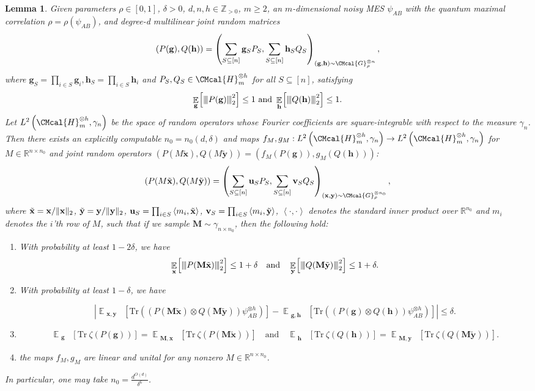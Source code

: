 \documentclass[11pt]{article}
\def\G{\CMcal{G}}
\def\H{\CMcal{H}}
\theoremstyle{plain}
\newtheorem{lemma}[theorem]{Lemma}
\theoremstyle{definition}
\newcommand {\minusspace} {\: \! \!}
\newcommand {\Fn} [2] {\ensuremath{ #1 \minusspace \Br{ #2 } }}
\newcommand{\reals}{{\mathbb R}}
\newcommand {\innerproduct} [2] {\ensuremath{\left \langle #1 , #2 \right \rangle}}
\newcommand {\br} [1] {\ensuremath{ \left( #1 \right) }}
\newcommand {\Br} [1] {\ensuremath{ \left[ #1 \right] }}
\DeclarePairedDelimiter{\norm}{\lVert}{\rVert}
\newcommand {\ab} [1] {\ensuremath{ \left| #1 \right| }}
\DeclareMathOperator*{\bigE}{\mathbb{E}}
\newcommand {\expec} [2] {\Fn{\bigE_{\substack{#1}}}{#2}}
\newcommand{\nnorm}[1]{{\left\vert\kern-0.25ex\left\vert\kern-0.25ex\left\vert #1
		\right\vert\kern-0.25ex\right\vert\kern-0.25ex\right\vert}}
\newcommand {\Tr} {\ensuremath{ \mathrm{Tr} }}
\newcommand{\posint}{{\mathbb Z}_{>0}}
\newcommand{\randg}{\ensuremath{\mathbf{g}}}
\newcommand{\randh}{\ensuremath{\mathbf{h}}}
\newcommand{\randx}{\ensuremath{\mathbf{x}}}
\newcommand{\randy}{\ensuremath{\mathbf{y}}}
\newcommand{\randu}{\ensuremath{\mathbf{u}}}
\newcommand{\randv}{\ensuremath{\mathbf{v}}}
\newcommand{\randM}{\ensuremath{\mathbf{M}}}
\newcommand{\herspace}[1]{\ensuremath{\H_m^{\otimes #1}}}
\newcommand{\1}{\mathbb{1}} %
\begin{document}
\begin{lemma}\cite[Lemma 5.13]{qin_et_al:LIPIcs.ICALP.2023.97}\label{lem:expectationdimensionreduction}
Given parameters $\rho\in\Br{0,1}$, $\delta>0$, $d,n,h\in\posint$, $m\geq2$, an $m$-dimensional noisy MES $\psi_{AB}$ with the quantum maximal correlation $\rho=\rho(\psi_{AB})$, and degree-d multilinear joint random matrices 
\[
\br{P(\randg),Q(\randh)}=\br{\sum_{S\subseteq[n]}\mathbf{g}_S P_S,\sum_{S\subseteq[n]}\mathbf{h}_S Q_S}_{\br{\mathbf{g},\mathbf{h}}\sim\G_\rho^{\otimes n}},
\]
where $\mathbf{g}_S=\prod_{i\in S}\mathbf{g}_i, \mathbf{h}_S=\prod_{i\in S}\mathbf{h}_i$ and $ P_S, Q_S\in\H_m^{\otimes h}$ for all $S\subseteq[n]$, satisfying 
\[\expec{\randg}{\nnorm{P(\randg)}_2^2}\leq1~\mbox{and}~\expec{\randh}{\nnorm{Q(\randh)}_2^2}\leq1.\] 
Let $L^2\br{\herspace{h},\gamma_{n}}$ be the space of random operators whose Fourier coefficients are square-integrable with respect to the measure $\gamma_n$. Then there exists an explicitly computable $n_0=n_0(d,\delta)$ and maps $f_M,g_M: L^2\br{\herspace{h},\gamma_{n}}\rightarrow L^2\br{\herspace{h},\gamma_{n}}$ for $M\in\reals^{n\times n_0}$ and joint random operators $\br{P(M\tilde{\randx}),Q(M\tilde{\randy})}=\br{f_M(P(\randg)),g_M(Q(\randh))}$:
 \[
\br{P(M\tilde{\randx}),Q(M\tilde{\randy})}=\br{\sum_{S\subseteq[n]}\randu_S P_S,\sum_{S\subseteq[n]}\randv_S Q_S}_{\br{\mathbf{x},\mathbf{y}}\sim\G_\rho^{\otimes n_0}},
\]
where $\tilde{\randx}=\randx/\norm{\randx}_2$, $\tilde{\randy}=\randy/\norm{\randy}_2$, $\mathbf\randu_S=\prod_{i\in S}\innerproduct{m_i}{\tilde{\randx}}$, $\mathbf\randv_S=\prod_{i\in S}\innerproduct{m_i}{\tilde{\randy}}$, $\innerproduct{\cdot}{\cdot}$ denotes the standard inner product over $\reals^{n_0}$ and $m_i$ denotes the $i$'th row of $M$, such that if we sample $\mathbf{M}\sim\gamma_{n\times n_0}$, then the following hold:
\begin{enumerate}
\item 
With probability at least $1-2\delta$, we have 
\[\expec{\randx}{\nnorm{P(\randM\tilde{\randx})}_2^2}\leq1+\delta\quad\mbox{and}\quad\expec{\randy}{\nnorm{Q(\randM\tilde{\randy})}_2^2}\leq1+\delta.\]

\item With probability at least $1-\delta$, we have 

\[\ab{\expec{\mathbf{x},\mathbf{y}}{\Tr\br{\br{P(\randM\tilde{\randx})\otimes Q(\randM\tilde{\randy})}\psi_{AB}^{\otimes h}}}-\expec{\mathbf{g},\mathbf{h}}{\Tr\br{\br{P(\randg)\otimes Q(\randh)}\psi_{AB}^{\otimes h}}}}\leq\delta.\]

\item \[\expec{\randg}{\Tr~\zeta\br{P(\randg)}}=\expec{\randM,\randx}{\Tr~\zeta\br{P(\randM\tilde{\randx})}}\quad\mbox{and}\quad\expec{\randh}{\Tr~\zeta\br{Q(\randh)}}=\expec{\randM,\randy}{\Tr~\zeta\br{Q(\randM\tilde{\randy})}}.\]

\item the maps $f_M, g_M$ are linear and unital for any nonzero $M\in\reals^{n\times n_0}$.
\end{enumerate}


In particular, one may take $n_0=\frac{d^{O(d)}}{\delta^6}$.
\end{lemma}
\end{document}
